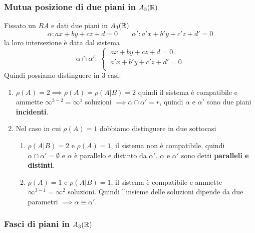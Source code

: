 \documentclass[twoside]{report}
\begin{document}
\subsubsection{Mutua posizione di due piani in \(A_3(\RR )\)}
Fissato un \(RA\) e dati due piani in \(A_3(\RR )\)\[
\alpha : ax + by + cz + d = 0 \qquad \alpha' : a'x + b'y + c'z + d' = 0
\] la loro intersezione è data dal sistema \[
\alpha \cap \alpha' : \
\begin{cases}
    \ ax + by + cz + d = 0 \\
    \ a'x + b'y + c'z + d' = 0 \\
\end{cases}
\] Quindi possiamo distinguere in 3 casi:
\begin{enumerate}
    \item \(\rho(A) = 2 \implies \rho(A) = \rho(A|B) = 2 \) quindi il sistema è compatibile e ammette \(\infty^{3-2} = \infty^{1}\) soluzioni \(\implies \alpha \cap \alpha' = r\), quindi \(\alpha \) e \(\alpha'\) sono due piani \textbf{incidenti}.
    \item Nel caso in cui \(\rho(A) = 1\) dobbiamo distinguere in due sottocasi
        \begin{enumerate}
            \item \(\rho(A|B) = 2 \) e \(\rho(A) = 1\), il sistema non è compatibile, quindi \(\alpha \cap \alpha' = \emptyset\) e \(\alpha \) è parallelo e distinto da \(\alpha'\). \(\alpha \) e \(\alpha'\) sono detti \textbf{paralleli e distinti}.
            \item \(\rho(A) = 1\) e \(\rho(A|B) = 1\), il sistema è compatibile e ammette \(\infty^{3-1} = \infty^{2}\) soluzioni. Quindi l'insieme delle soluzioni dipende da due parametri \(\implies \alpha \equiv \alpha'\).
        \end{enumerate}
\end{enumerate}


\subsubsection{Fasci di piani in \(A_3(\RR )\)}
\end{document}
